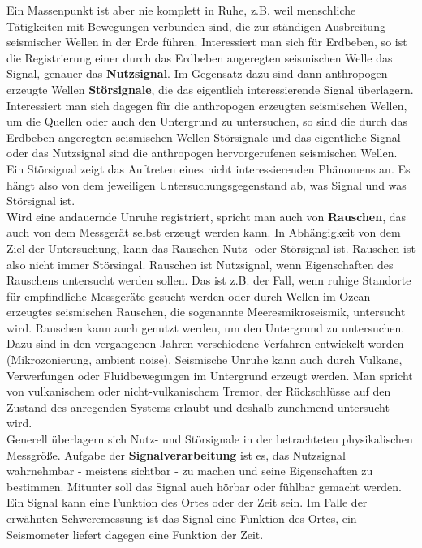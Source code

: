 Ein Massenpunkt ist aber nie komplett in Ruhe, z.B. weil menschliche Tätigkeiten mit Bewegungen verbunden sind, die zur ständigen Ausbreitung seismischer Wellen in der Erde führen. Interessiert man sich für Erdbeben, so ist die Registrierung einer durch das Erdbeben angeregten seismischen Welle das Signal, genauer das {\bf Nutzsignal}. Im Gegensatz dazu sind dann anthropogen erzeugte Wellen {\bf Störsignale}, die das eigentlich interessierende Signal überlagern. Interessiert man sich dagegen für die anthropogen erzeugten seismischen Wellen, um die Quellen oder auch den Untergrund zu untersuchen, so sind die durch das Erdbeben angeregten seismischen Wellen Störsignale und das eigentliche Signal oder das Nutzsignal sind die anthropogen hervorgerufenen seismischen Wellen. Ein Störsignal zeigt das Auftreten eines nicht interessierenden Phänomens an. Es hängt also von dem jeweiligen Untersuchungsgegenstand ab, was Signal und was Störsignal ist.\\
Wird eine andauernde Unruhe registriert, spricht man auch von {\bf Rauschen}, das auch von dem Messgerät selbst erzeugt werden kann. In Abhängigkeit von dem Ziel der Untersuchung, kann das Rauschen Nutz- oder Störsignal ist.  Rauschen ist also nicht immer Störsingal. Rauschen ist Nutzsignal, wenn Eigenschaften des Rauschens untersucht werden sollen. Das ist z.B. der Fall, wenn ruhige Standorte für empfindliche Messgeräte gesucht werden oder durch Wellen im Ozean erzeugtes seismischen Rauschen, die sogenannte Meeresmikroseismik, untersucht wird. Rauschen kann auch genutzt werden, um den Untergrund zu untersuchen. Dazu sind in den vergangenen Jahren verschiedene Verfahren entwickelt worden (Mikrozonierung, ambient noise). Seismische Unruhe kann auch durch Vulkane, Verwerfungen oder Fluidbewegungen im Untergrund erzeugt werden. Man spricht von vulkanischem oder nicht-vulkanischem Tremor, der Rückschlüsse auf den Zustand des anregenden Systems erlaubt und deshalb zunehmend untersucht wird.\\
Generell überlagern sich Nutz- und Störsignale in der betrachteten physikalischen Messgröße. Aufgabe der {\bf Signalverarbeitung} ist es, das Nutzsignal wahrnehmbar - meistens sichtbar - zu machen und seine Eigenschaften zu bestimmen. Mitunter soll das Signal auch hörbar oder fühlbar gemacht werden.\\
Ein Signal kann eine Funktion des Ortes oder der Zeit sein. Im Falle der erwähnten Schweremessung ist das Signal eine Funktion des Ortes, ein Seismometer liefert dagegen eine Funktion der Zeit.\\

